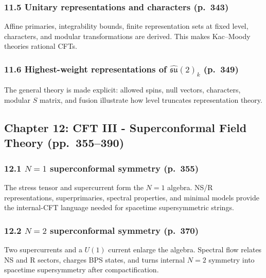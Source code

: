\documentclass[
  10pt,
  a4paper,
  openany]{book}
\begin{document}
\subsubsection{11.5 Unitary representations and characters
(p.~343)}\label{unitary-representations-and-characters-p.-343}

Affine primaries, integrability bounds, finite representation sets at
fixed level, characters, and modular transformations are derived. This
makes Kac--Moody theories rational CFTs.

\subsubsection{\texorpdfstring{11.6 Highest-weight representations of
\(\widehat{\mathfrak{su}}(2)_k\)
(p.~349)}{11.6 Highest-weight representations of \textbackslash widehat\{\textbackslash mathfrak\{su\}\}(2)\_k (p.~349)}}\label{highest-weight-representations-of-widehatmathfraksu2_k-p.-349}

The general theory is made explicit: allowed spins, null vectors,
characters, modular \(S\) matrix, and fusion illustrate how level
truncates representation theory.

\subsection{Chapter 12: CFT III - Superconformal Field Theory
(pp.~355--390)}\label{chapter-12-cft-iii---superconformal-field-theory-pp.-355390}

\subsubsection{\texorpdfstring{12.1 \(N=1\) superconformal symmetry
(p.~355)}{12.1 N=1 superconformal symmetry (p.~355)}}\label{n1-superconformal-symmetry-p.-355}

The stress tensor and supercurrent form the \(N=1\) algebra. NS/R
representations, superprimaries, spectral properties, and minimal models
provide the internal-CFT language needed for spacetime supersymmetric
strings.

\subsubsection{\texorpdfstring{12.2 \(N=2\) superconformal symmetry
(p.~370)}{12.2 N=2 superconformal symmetry (p.~370)}}\label{n2-superconformal-symmetry-p.-370}

Two supercurrents and a \(U(1)\) current enlarge the algebra. Spectral
flow relates NS and R sectors, charges BPS states, and turns internal
\(N=2\) symmetry into spacetime supersymmetry after compactification.
\end{document}
